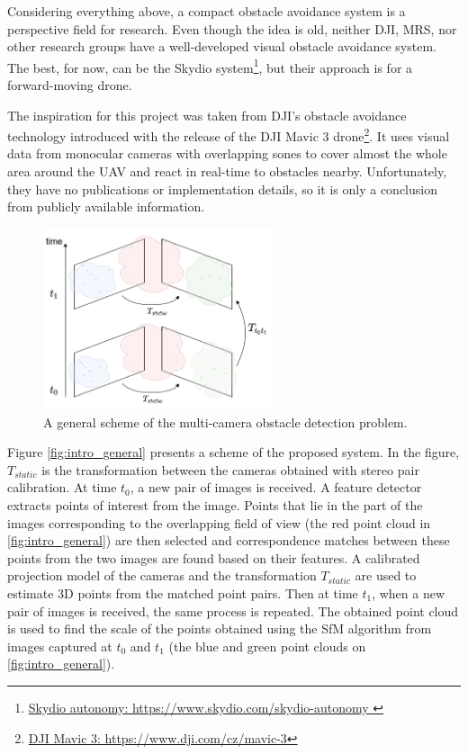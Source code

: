 Considering everything above, a compact obstacle avoidance system is a perspective field for research. 
Even though the idea is old, neither DJI, MRS, nor other research groups have a well-developed visual obstacle avoidance system. 
The best, for now, can be the Skydio system\footnote{\href{https://www.skydio.com/skydio-autonomy}{Skydio autonomy: https://www.skydio.com/skydio-autonomy }}, but their approach is for a forward-moving drone.

The inspiration for this project was taken from DJI's obstacle avoidance technology introduced with the release of the DJI Mavic 3 drone\footnote{\href{https://www.dji.com/cz/mavic-3}{DJI Mavic 3: https://www.dji.com/cz/mavic-3}}. 
It uses visual data from monocular cameras with overlapping sones to cover almost the whole area around the UAV and react in real-time to obstacles nearby. 
Unfortunately, they have no publications or implementation details, so it is only a conclusion from publicly available information.

\begin{figure}[t]
    \centering
    \includegraphics[width=0.6\textwidth]{graphics/general_scheme.png}
    \caption{ A general scheme of the multi-camera obstacle detection problem.}
    \label{fig:intro_general}
\end{figure}

Figure \autoref{fig:intro_general} presents a scheme of the proposed system.
In the figure, $T_{static}$ is the transformation between the cameras obtained with stereo pair calibration. 
At time $t_0$, a new pair of images is received.
A feature detector extracts points of interest from the image.
Points that lie in the part of the images corresponding to the overlapping field of view (the red point cloud in \autoref{fig:intro_general}) are then selected and correspondence matches between these points from the two images are found based on their features.
A calibrated projection model of the cameras and the transformation $T_{static}$ are used to estimate 3D points from the matched point pairs.
Then at time $t_1$, when a new pair of images is received, the same process is repeated. 
The obtained point cloud is used to find the scale of the points obtained using the SfM algorithm from images captured at $t_0$ and $t_1$ (the blue and green point clouds on \autoref{fig:intro_general}).

